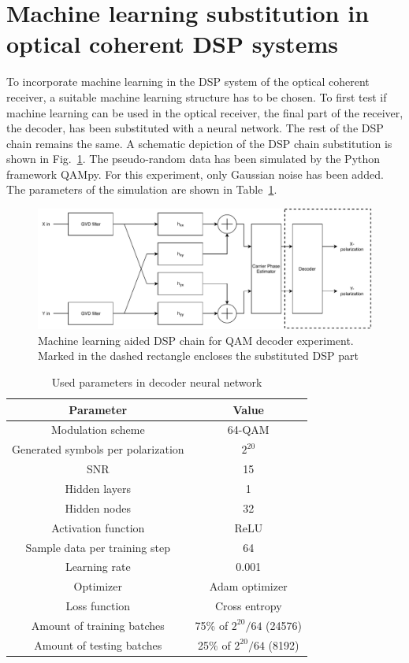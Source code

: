 \documentclass[journal,10pt,twoside, a4paper]{IEEEtran}
\begin{document}
\section{Machine learning substitution in optical coherent DSP systems}
To incorporate machine learning in the DSP system of the optical coherent receiver, a suitable machine learning structure has to be chosen. To first test if machine learning can be used in the optical receiver, the final part of the receiver, the decoder, has been substituted with a neural network. The rest of the DSP chain remains the same. A schematic depiction of the DSP chain substitution is shown in Fig.~\ref{fig:dsp_linear}. The pseudo-random data has been simulated by the Python framework QAMpy. For this experiment, only Gaussian noise has been added. The parameters of the simulation are shown in Table~\ref{tab:linear}.

\begin{figure}
    \centering
    \includegraphics[width=\linewidth]{Thesis/images/DSP_linear.pdf}
    \caption{Machine learning aided DSP chain for QAM decoder experiment. Marked in the dashed rectangle encloses the substituted DSP part}
    \label{fig:dsp_linear}
\end{figure}

\begin{table}
    \centering
    \caption{Used parameters in decoder neural network}
    \label{tab:linear}
    \begin{tabular}{c|c}
        Parameter & Value\\
        \hline
        Modulation scheme & 64-QAM\\
        Generated symbols per polarization & $2^{20}$\\
        SNR & 15\\
        Hidden layers & 1\\
        Hidden nodes & 32\\
        Activation function & ReLU\\
        Sample data per training step & 64\\
        Learning rate & 0.001\\
        Optimizer & Adam optimizer\\
        Loss function & Cross entropy\\
        Amount of training batches & 75\% of $2^{20}/64$ (24576)\\
        Amount of testing batches & 25\% of $2^{20}/64$ (8192)\\
    \end{tabular}
\end{table}
\end{document}
